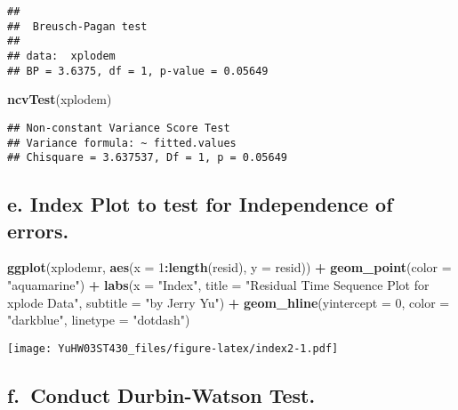 \documentclass[
]{article}
\newenvironment{Shaded}{\begin{snugshade}}{\end{snugshade}}
\newcommand{\AttributeTok}[1]{\textcolor[rgb]{0.13,0.29,0.53}{#1}}
\newcommand{\DecValTok}[1]{\textcolor[rgb]{0.00,0.00,0.81}{#1}}
\newcommand{\FunctionTok}[1]{\textcolor[rgb]{0.13,0.29,0.53}{\textbf{#1}}}
\newcommand{\NormalTok}[1]{#1}
\newcommand{\SpecialCharTok}[1]{\textcolor[rgb]{0.81,0.36,0.00}{\textbf{#1}}}
\newcommand{\StringTok}[1]{\textcolor[rgb]{0.31,0.60,0.02}{#1}}
\begin{document}
\begin{verbatim}
## 
##  Breusch-Pagan test
## 
## data:  xplodem
## BP = 3.6375, df = 1, p-value = 0.05649
\end{verbatim}

\begin{Shaded}
\begin{Highlighting}[]
\FunctionTok{ncvTest}\NormalTok{(xplodem)}
\end{Highlighting}
\end{Shaded}

\begin{verbatim}
## Non-constant Variance Score Test 
## Variance formula: ~ fitted.values 
## Chisquare = 3.637537, Df = 1, p = 0.05649
\end{verbatim}

\hypertarget{e.-index-plot-to-test-for-independence-of-errors.}{%
\subsection{e. Index Plot to test for Independence of
errors.}\label{e.-index-plot-to-test-for-independence-of-errors.}}

\begin{Shaded}
\begin{Highlighting}[]
\FunctionTok{ggplot}\NormalTok{(xplodemr, }\FunctionTok{aes}\NormalTok{(}\AttributeTok{x =} \DecValTok{1}\SpecialCharTok{:}\FunctionTok{length}\NormalTok{(resid), }\AttributeTok{y =}\NormalTok{ resid)) }\SpecialCharTok{+}
  \FunctionTok{geom\_point}\NormalTok{(}\AttributeTok{color =} \StringTok{"aquamarine"}\NormalTok{) }\SpecialCharTok{+}
  \FunctionTok{labs}\NormalTok{(}\AttributeTok{x =} \StringTok{"Index"}\NormalTok{,}
       \AttributeTok{title =} \StringTok{"Residual Time Sequence Plot for xplode Data"}\NormalTok{,}
       \AttributeTok{subtitle =} \StringTok{"by Jerry Yu"}\NormalTok{) }\SpecialCharTok{+}
  \FunctionTok{geom\_hline}\NormalTok{(}\AttributeTok{yintercept =} \DecValTok{0}\NormalTok{,}
             \AttributeTok{color =} \StringTok{"darkblue"}\NormalTok{,}
             \AttributeTok{linetype =} \StringTok{"dotdash"}\NormalTok{)}
\end{Highlighting}
\end{Shaded}

\texttt{[image: YuHW03ST430\_files/figure-latex/index2-1.pdf]}

\hypertarget{f.-conduct-durbin-watson-test.}{%
\subsection{f.~Conduct Durbin-Watson
Test.}\label{f.-conduct-durbin-watson-test.}}
\end{document}
